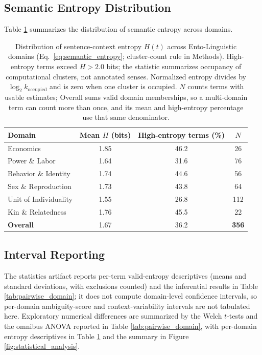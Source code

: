 \documentclass[
]{article}
\numberwithin{equation}{section}
\begin{document}
\subsection{Semantic Entropy
Distribution}\label{semantic-entropy-distribution}

Table \ref{tab:entropy_distribution} summarizes the distribution of
semantic entropy across domains.

\begin{table}[h]
\centering
\begin{tabular}{|l|c|c|c|}
\hline
\textbf{Domain} & \textbf{Mean $H$ (bits)} & \textbf{High-entropy terms (\%)} & \textbf{$N$} \\
\hline
Economics & 1.85 & 46.2 & 26 \\
Power \& Labor & 1.64 & 31.6 & 76 \\
Behavior \& Identity & 1.74 & 44.6 & 56 \\
Sex \& Reproduction & 1.73 & 43.8 & 64 \\
Unit of Individuality & 1.55 & 26.8 & 112 \\
Kin \& Relatedness & 1.76 & 45.5 & 22 \\
\hline
\textbf{Overall} & 1.67 & 36.2 & \textbf{ 356 } \\
\hline
\end{tabular}
\caption{Distribution of sentence-context entropy $H(t)$ across Ento-Linguistic domains (Eq.~\ref{eq:semantic_entropy}; cluster-count rule in Methods). High-entropy terms exceed $H > 2.0$ bits; the statistic summarizes occupancy of computational clusters, not annotated senses. Normalized entropy divides by $\log_2 k_{\mathrm{occupied}}$ and is zero when one cluster is occupied. $N$ counts terms with usable estimates; Overall sums valid domain memberships, so a multi-domain term can count more than once, and its mean and high-entropy percentage use that same denominator.}
\label{tab:entropy_distribution}
\end{table}

\subsection{Interval Reporting}\label{interval-reporting}

The statistics artifact reports per-term valid-entropy descriptives
(means and standard deviations, with exclusions counted) and the
inferential results in Table \ref{tab:pairwise_domain}; it does not
compute domain-level confidence intervals, so per-domain ambiguity-score
and context-variability intervals are not tabulated here. Exploratory
numerical differences are summarized by the Welch \(t\)-tests and the
omnibus ANOVA reported in Table \ref{tab:pairwise_domain}, with
per-domain entropy descriptives in Table \ref{tab:entropy_distribution}
and the summary in Figure \ref{fig:statistical_analysis}.
\end{document}
